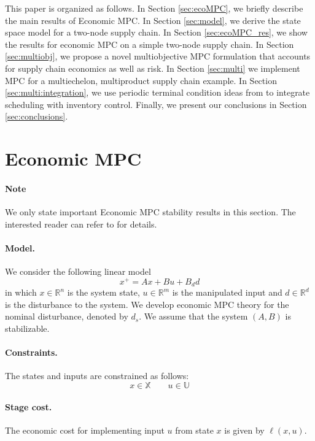 \documentclass{elsarticle}
\theoremstyle{definition}
\begin{document}
This paper is organized as follows. In Section \ref{sec:ecoMPC}, we
briefly describe the main results of Economic MPC. In Section
\ref{sec:model}, we derive the state space model for a two-node supply
chain. In Section \ref{sec:ecoMPC_res}, we show the results for
economic MPC on a simple two-node supply chain. In Section
\ref{sec:multiobj}, we propose a novel
multiobjective MPC formulation that accounts for supply chain
economics as well as risk. In Section \ref{sec:multi} we implement MPC for a 
multiechelon, multiproduct supply chain example. In Section
\ref{sec:multi:integration}, we use periodic terminal condition ideas from
\cite{subramanian:maravelias:rawlings:2012} to integrate scheduling
with inventory control. Finally, we present our conclusions in Section
\ref{sec:conclusions}.

\section{Economic MPC}
\paragraph{Note} We only state important Economic MPC stability results in this section. The interested reader can refer to \cite{amrit:rawlings:angeli:2011,
  diehl:amrit:rawlings:2011} for details.
\label{sec:ecoMPC}
\paragraph{Model.}
We consider the following linear model
\begin{equation}
\label{eq:model}
x^+ = Ax + Bu + B_dd
\end{equation}
in which $x \in \mathbb{R}^n$ is the system state, $u \in
\mathbb{R}^m$  is the manipulated input and $d \in \mathbb{R}^d$ is
the disturbance to the system. We develop economic MPC theory for
the nominal disturbance, denoted by $d_s$. We assume that the system
$(A,B)$ is stabilizable.

\paragraph{Constraints.}
The states and inputs are constrained as follows:
\begin{equation}
x \in \mathbb{X} \qquad u \in \mathbb{U}
\end{equation}
\paragraph{Stage cost.}
The economic cost for implementing input $u$ from state $x$ is given
by $\ell(x,u)$. 
\end{document}
